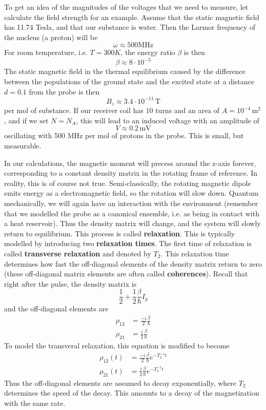 \documentclass[a4paper, draft]{article}
\theoremstyle{own}
\theoremstyle{remark}
\begin{document}
To get an idea of the magnitudes of the voltages that we need to measure, let calculate the field strength for an example. Assume that the static magnetic field has 11.74 Tesla, and that our substance is water. Then the Larmor frequency of the nucleus (a proton) will be
$$
\omega \approx 500 \text{MHz}
$$
For room temperature, i.e. $T = 300 K$, the energy ratio $\beta$ is then
$$
\beta \approx 8 \cdot 10^{-5}
$$
The static magnetic field in the thermal equilibrium caused by the difference between the populations of the ground state and the excited state at a distance $d = 0.1$ from the probe is then
$$
B_z \approx 3.4 \cdot 10^{-11} \, \text{T}
$$
per mol of substance. If our receiver coil has $10$ turns and an area of $A = 10^{-4} \, \text{m}^2 $, and if we set $N = N_A$, this will lead to an induced voltage with an amplitude of
$$
V \approx 0.2 \, \text{mV}
$$
oscillating with 500 MHz per mol of protons in the probe. This is small, but measurable. 

In our calculations, the magnetic moment will precess around the z-axis forever, corresponding to a constant density matrix in the rotating frame of reference. In reality, this is of course not true. Semi-classically, the rotating magnetic dipole emits energy as a electromagnetic field, so the rotation will slow down. Quantum mechanically, we will again have an interaction with the environment (remember that we modelled the probe as a canonical ensemble, i.e. as being in contact with a heat reservoir). Thus the  
density matrix will change, and the system will slowly return to equilibrium. This process is called {\bf relaxation}. This is typically modelled by introducing two {\bf relaxation times}. The first time of relaxation is called {\bf transverse relaxation} and denoted by $T_2$. This relaxation time determines how fast the off-diagonal elements of the density matrix return to zero (these off-diagonal matrix elements are often called {\bf coherences}). Recall that right after the pulse, the density matrix is
$$
\frac{1}{2} + \frac{1}{2} \frac{\beta}{\hbar} I_y
$$
and the off-diagonal elements are 
\begin{align*}
\rho_{12} &= \frac{-i}{2} \frac{\beta}{\hbar} \\
\rho_{21} &= \frac{i}{2} \frac{\beta}{\hbar} 
\end{align*}
To model the transveral relaxation, this equation is modified to become
\begin{align*}
\rho_{12}(t) &= \frac{-i}{2} \frac{\beta}{\hbar} e^{- T_2^{-1} t}\\
\rho_{21}(t) &= \frac{i}{2} \frac{\beta}{\hbar} e^{- T_2^{-1} t}
\end{align*}
Thus the off-diagonal elements are assumed to decay exponentially, where $T_2$ determines the speed of the decay. This amounts to a decay of the magnetization with the same rate. 
\end{document}
